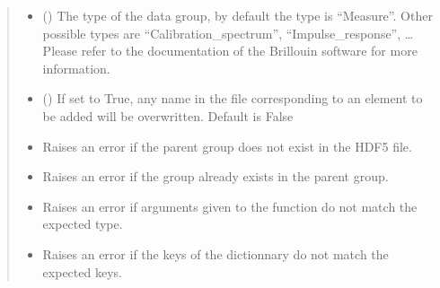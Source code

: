\documentclass[letterpaper,10pt,english]{sphinxmanual}
\begin{document}
\begin{fulllineitems}
\begin{fulllineitems}
\begin{quote}
\begin{description}
\begin{itemize}
\item {} 
\sphinxAtStartPar
{} (\sphinxstyleliteralemphasis{\sphinxupquote{, }}) \textendash{} The type of the data group, by default the type is “Measure”. Other possible types are “Calibration\_spectrum”, “Impulse\_response”, … Please refer to the documentation of the Brillouin software for more information.

\item {} 
\sphinxAtStartPar
{} (\sphinxstyleliteralemphasis{\sphinxupquote{, }}) \textendash{} If set to True, any name in the file corresponding to an element to be added will be overwritten. Default is False

\end{itemize}

\begin{itemize}
\item {} 
\sphinxAtStartPar
{} \textendash{} Raises an error if the parent group does not exist in the HDF5 file.

\item {} 
\sphinxAtStartPar
{} \textendash{} Raises an error if the group already exists in the parent group.

\item {} 
\sphinxAtStartPar
{} \textendash{} Raises an error if arguments given to the function do not match the expected type.

\item {} 
\sphinxAtStartPar
{} \textendash{} Raises an error if the keys of the dictionnary do not match the expected keys.

\end{itemize}

\end{description}\end{quote}

\end{fulllineitems}



\end{fulllineitems}
\end{document}
